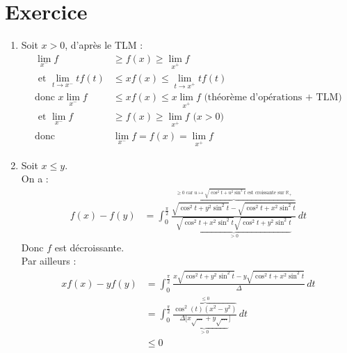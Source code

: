 \documentclass{report}
\begin{document}
\section{Exercice}
\begin{enumerate}
    \item Soit $x > 0$, d'après le TLM : 
    \begin{align*}
        \lim_{x^-} f &\geq f(x) \geq \lim_{x^+} f \\
        \text{ et } \lim_{t\to x^-} tf(t) &\leq xf(x) \leq \lim_{t\to x^+} tf(t) \\
        \text{donc } x \lim_{x^-} f &\leq xf(x) \leq x \lim_{x^+} f \text{ (théorème d'opérations + TLM)} \\
        \text{ et } \lim_{x^-} f &\geq f(x) \geq \lim_{x^+} f \text{ ($x > 0$)} \\
        \text{donc } &\boxed{\lim_{x^-} f = f(x) = \lim_{x^+} f}
    \end{align*}

    \item Soit $x \leq y$. \\
    On a : 
    \begin{align*}
        f(x) - f(y) &= \int_{0}^{\frac{\pi}{2}} \frac{\overbrace{\sqrt{\cos^2 t + y^2 \sin^2 t} - \sqrt{\cos^2 t + x^2 \sin^2 t}}^{\geq 0 \text{ car } u\mapsto \sqrt{\cos^2 t + u^2 \sin^2 t} \text{ est croissante sur } \mathbb{R}_+}}{\underbrace{\sqrt{\cos^2 t + x^2 \sin^2 t} \sqrt{\cos^2 t + y^2 \sin^2 t}}_{> 0}} \,dt
    \end{align*}
    Donc $f$ est décroissante. \\
    Par ailleurs : 
    \begin{align*}
        xf(x) - yf(y) &= \int_{0}^{\frac{\pi}{2}} \frac{x\sqrt{\cos^2 t + y^2 \sin^2 t} - y\sqrt{\cos^2 t + x^2 \sin^2 t}}{\Delta} \,dt \\
        &= \int_{0}^{\frac{\pi}{2}} \frac{\overbrace{\cos^2 (t) (x^2 - y^2)}^{\leq 0}}{\underbrace{\Delta[x\sqrt{\ldots} + y\sqrt{\ldots}}_{> 0}]} \,dt \\
        &\leq 0
    \end{align*}
\end{enumerate}
\end{document}
